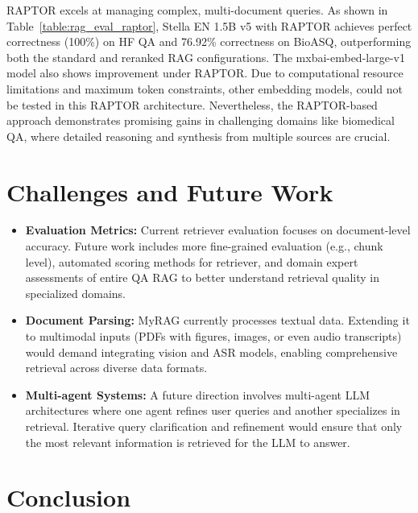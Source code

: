 \documentclass[pdflatex,sn-mathphys-num]{sn-jnl}%
\theoremstyle{thmstyleone}%
\theoremstyle{thmstyletwo}%
\theoremstyle{thmstylethree}%
\begin{document}
RAPTOR excels at managing complex, multi-document queries. As shown in Table~\ref{table:rag_eval_raptor}, Stella EN 1.5B v5 with RAPTOR achieves perfect correctness (100\%) on HF QA and 76.92\% correctness on BioASQ, outperforming both the standard and reranked RAG configurations. The mxbai-embed-large-v1 model also shows improvement under RAPTOR. Due to computational resource limitations and maximum token constraints, other embedding models, could not be tested in this RAPTOR architecture. Nevertheless, the RAPTOR-based approach demonstrates promising gains in challenging domains like biomedical QA, where detailed reasoning and synthesis from multiple sources are crucial.

\section{Challenges and Future Work}\label{sec5}
\begin{itemize}
    \item \textbf{Evaluation Metrics:} Current retriever evaluation focuses on document-level accuracy. Future work includes more fine-grained evaluation (e.g., chunk level), automated scoring methods for retriever, and domain expert assessments of entire QA RAG to better understand retrieval quality in specialized domains.
    
    \item \textbf{Document Parsing:} MyRAG currently processes textual data. Extending it to multimodal inputs (PDFs with figures, images, or even audio transcripts) would demand integrating vision and ASR models, enabling comprehensive retrieval across diverse data formats.
    
    \item \textbf{Multi-agent Systems:} A future direction involves multi-agent LLM architectures where one agent refines user queries and another specializes in retrieval. Iterative query clarification and refinement would ensure that only the most relevant information is retrieved for the LLM to answer.
\end{itemize}

\section{Conclusion}\label{sec6}
\end{document}
